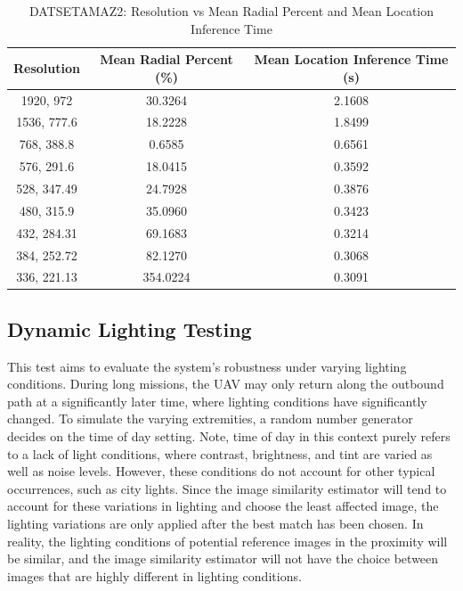 \begin{table}[H]
\centering
\begin{tabular}{|c|c|c|}
\hline
\textbf{Resolution} & \textbf{Mean Radial Percent (\%)} & \textbf{Mean Location Inference Time (s)} \\
\hline
1920, 972 & 30.3264 & 2.1608 \\
1536, 777.6 & 18.2228 & 1.8499 \\
768, 388.8 & 0.6585 & 0.6561 \\
576, 291.6 & 18.0415 & 0.3592 \\
528, 347.49 & 24.7928 & 0.3876 \\
480, 315.9 & 35.0960 & 0.3423 \\
432, 284.31 & 69.1683 & 0.3214 \\
384, 252.72 & 82.1270 & 0.3068 \\
336, 221.13 & 354.0224 & 0.3091 \\
\hline
\end{tabular}
\caption{DATSETAMAZ2: Resolution vs Mean Radial Percent and Mean Location Inference Time}
\label{tab:datsetamaz2}
\end{table}



























\subsection{Dynamic Lighting Testing}
This test aims to evaluate the system's robustness under varying lighting conditions. During long missions, the UAV may only return along the outbound path at a significantly later time, where lighting conditions have significantly changed. To simulate the varying extremities, a random number generator decides on the time of day setting. Note, time of day in this context purely refers to a lack of light conditions, where contrast, brightness, and tint are varied as well as noise levels. However, these conditions do not account for other typical occurrences, such as city lights. Since the image similarity estimator will tend to account for these variations in lighting and choose the least affected image, the lighting variations are only applied after the best match has been chosen. In reality, the lighting conditions of potential reference images in the proximity will be similar, and the image similarity estimator will not have the choice between images that are highly different in lighting conditions.

